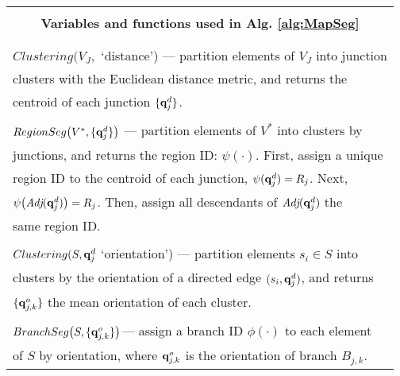 \begin{table}\label{table2}
	\vspace{1\baselineskip}
	\begin{tabular}{l}
		\Xhline{0.8pt}	 
		\\[-0.8em]
		\multicolumn{1}{c}{\bf {Variables and functions used in Alg. \ref{alg:MapSeg} }}  \\
		\\[-1.1em]
		\hline
		\\[-0.8em]
		$Clustering(V_J,$ `distance') --- partition elements of $V_J$ into junction\\ clusters with the Euclidean distance metric, and returns the \\ centroid of each junction $\{ {\bf q}^d_j \}$.\\
		\\[-0.5em]
		$RegionSeg\big(V^*,\{{\bf q}^d_{j}\}\big)$ --- partition elements of $V^*$ into clusters by \\junctions, and returns the region ID: $\psi({\cdot})$. First,  assign a unique \\region ID to the centroid of each junction, $\psi({\bf q}^d_{j})=R_j$. Next,\\ $\psi\big(\textit{Adj}({\bf q}^d_{j}) \big)=R_j$. Then, assign all descendants of $\textit{Adj}({\bf q}^d_{j})$ the \\same region ID. \\
		\\[-0.5em]
		$Clustering(S,{\bf q}^d_{j}$ `orientation') --- partition elements $s_i\in S$ into\\ clusters by the orientation of a directed edge $(s_i,{\bf q}^d_{j})$, and returns \\ $\{ {\bf q}^o_{j,k} \}$ the mean orientation of each cluster. \\
		\\[-0.5em]
		$BranchSeg\big(S,\{{\bf q}^{o}_{j,k}\}\big)$--- assign a branch ID $\phi(\cdot)$ to each element \\of $S$ by orientation, where ${\bf q}^o_{j,k}$ is the orientation of branch $B_{j,k}$.\\
		\hline
	\end{tabular}
\end{table}

